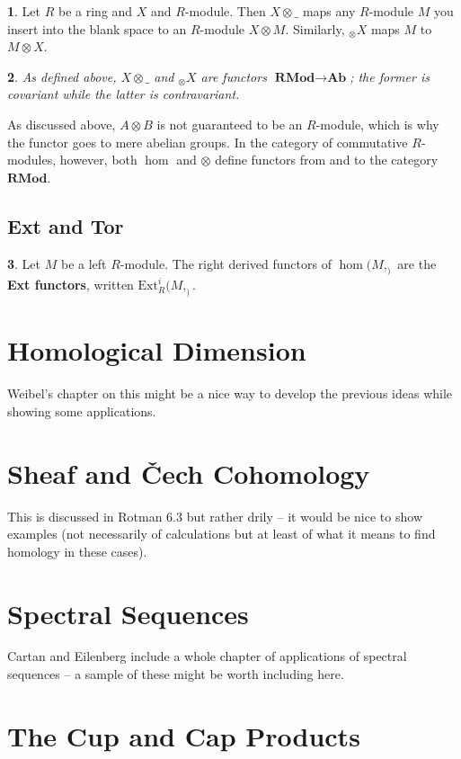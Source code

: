 \documentclass[oneside,english]{amsbook}
\numberwithin{section}{chapter}
\theoremstyle{plain}
\newtheorem{thm}{\protect\theoremname}
\theoremstyle{definition}
\newtheorem{defn}[thm]{\protect\definitionname}
\providecommand{\definitionname}{Definition}
\providecommand{\theoremname}{Theorem}
\providecommand{\Cech}{\v{C}ech }
\begin{document}
			\begin{defn}
				Let $R$ be a ring and $X$ and $R$-module. Then $X\otimes \_ $ maps any $R$-module $M$ you insert into the blank space to an $R$-module $X\otimes M$. Similarly, $_\otimes X$ maps $M$ to $M\otimes X$.
			\end{defn}
			
			\begin{thm}
				As defined above, $X\otimes \_$ and $_\otimes X$ are functors  $\textbf{RMod}\to \textbf{Ab}$; the former is covariant while the latter is contravariant.
			\end{thm}
			
			As discussed above, $A\otimes B$ is not guaranteed to be an $R$-module, which is why the functor goes to mere abelian groups. In the category of commutative $R$-modules, however, both $\hom$ and $\otimes$ define functors from and to the category $\textbf{RMod}$.
			
	
		\section{Ext and Tor}
		
			\begin{defn}
				Let $M$ be a left $R$-module. The right derived functors of $\hom(M, _)$ are the \textbf{Ext functors}, written $\text{Ext}^i_R(M, _)$.
			\end{defn}
	
	\chapter{Homological Dimension}
	
	Weibel's chapter on this might be a nice way to develop the previous ideas while showing some applications.
	
	\chapter{Sheaf and \Cech Cohomology}
	
	This is discussed in Rotman 6.3 but rather drily -- it would be nice to show examples (not necessarily of calculations but at least of what it means to find homology in these cases).

	\chapter{Spectral Sequences}
	
	Cartan and Eilenberg include a whole chapter of applications of spectral sequences -- a sample of these might be worth including here.

	\chapter{The Cup and Cap Products}
\end{document}

